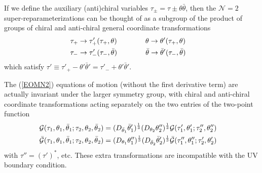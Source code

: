 \documentclass[aps,pre,preprint,onecolumn,citeautoscript,superscriptaddress,nofootinbib,eqsecnum]{revtex4-1}
\begin{document}
If we define the auxiliary (anti)chiral variables $\tau_{\pm} = \tau \pm \theta \bar \theta$, then the $\mathcal{N}=2$ super-reparameterizations
can be thought of as a subgroup of the product of groups of chiral and anti-chiral general coordinate transformations
\begin{align}
\tau_+ &\to \tau'_+(\tau_+, \theta) \qquad \qquad \theta \to \theta'(\tau_+, \theta) \cr
\tau_- &\to \tau'_-(\tau_-, \bar \theta) \qquad \qquad \bar \theta \to \bar \theta'(\tau_-, \bar\theta)
\end{align}
which satisfy $\tau' \equiv \tau'_+ - \theta' \bar \theta' = \tau'_- + \theta' \bar \theta'$.

The (\ref{EOMN2}) equations of motion (without the first derivative term) are actually invariant under the larger symmetry group, with
chiral and anti-chiral coordinate transformations acting separately on the two entries of the two-point function
\begin{align}\label{eq:extended}
\mathcal{G}(\tau_1,\theta_1, \bar \theta_1;\tau_2,\theta_2, \bar \theta_2) &= (D_{\bar \theta_1} \bar \theta'_1)^{\frac13} (D_{\theta_2} \theta''_2)^{\frac13} \mathcal{G}(\tau'_1,\theta'_1;\tau''_2,\theta''_2) \cr
\mathcal{\bar G}(\tau_1,\theta_1, \bar \theta_1;\tau_2,\theta_2, \bar \theta_2) &= (D_{\theta_1} \theta''_1)^{\frac13} (D_{\bar \theta_2} \bar \theta'_2)^{\frac13} \mathcal{\bar G}(\tau''_1,\theta''_1;\tau'_2,\theta'_2)
\end{align}
with $\tau'' = (\tau')^*$, etc. These extra transformations are incompatible with the UV boundary condition. 
\end{document}
